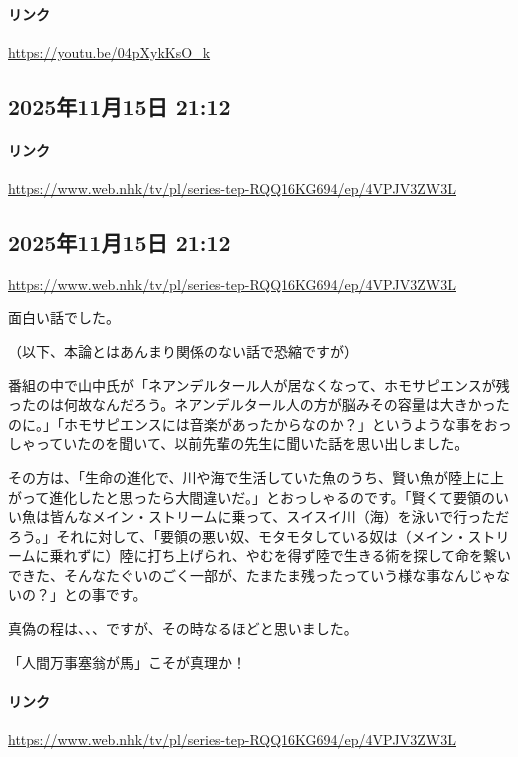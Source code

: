 \paragraph{リンク}
\url{https://youtu.be/04pXykKsO_k}

\subsection*{2025年11月15日 21:12}

\paragraph{リンク}
\url{https://www.web.nhk/tv/pl/series-tep-RQQ16KG694/ep/4VPJV3ZW3L}

\subsection*{2025年11月15日 21:12}

\url{https://www.web.nhk/tv/pl/series-tep-RQQ16KG694/ep/4VPJV3ZW3L}

面白い話でした。

（以下、本論とはあんまり関係のない話で恐縮ですが）

番組の中で山中氏が「ネアンデルタール人が居なくなって、ホモサピエンスが残ったのは何故なんだろう。ネアンデルタール人の方が脳みその容量は大きかったのに。」「ホモサピエンスには音楽があったからなのか？」というような事をおっしゃっていたのを聞いて、以前先輩の先生に聞いた話を思い出しました。

その方は、「生命の進化で、川や海で生活していた魚のうち、賢い魚が陸上に上がって進化したと思ったら大間違いだ。」とおっしゃるのです。「賢くて要領のいい魚は皆んなメイン・ストリームに乗って、スイスイ川（海）を泳いで行っただろう。」それに対して、「要領の悪い奴、モタモタしている奴は（メイン・ストリームに乗れずに）陸に打ち上げられ、やむを得ず陸で生きる術を探して命を繋いできた、そんなたぐいのごく一部が、たまたま残ったっていう様な事なんじゃないの？」との事です。

真偽の程は、、、ですが、その時なるほどと思いました。

「人間万事塞翁が馬」こそが真理か！

\paragraph{リンク}
\url{https://www.web.nhk/tv/pl/series-tep-RQQ16KG694/ep/4VPJV3ZW3L}

